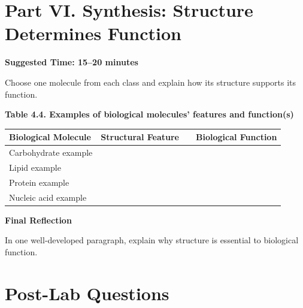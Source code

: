 \documentclass[
  letterpaper,
  DIV=11,
  numbers=noendperiod]{scrreprt}
\newcounter{none} %
\begin{document}
\section{\texorpdfstring{\textbf{Part VI. Synthesis: Structure
Determines
Function}}{Part VI. Synthesis: Structure Determines Function}}\label{part-vi.-synthesis-structure-determines-function}

\textbf{Suggested Time: 15--20 minutes}

Choose one molecule from each class and explain how its structure
supports its function.

\textbf{Table 4.4. Examples of biological molecules' features and
function(s)}

{\def\LTcaptype{none} %
\begin{longtable}[]{@{}
  >{\raggedright\arraybackslash}p{}
  >{\raggedright\arraybackslash}p{}
  >{\raggedright\arraybackslash}p{}
  >{\raggedright\arraybackslash}p{}@{}}
\toprule\noalign{}
\begin{minipage}[b]{\linewidth}\raggedright
\textbf{Biological Molecule}
\end{minipage} & \begin{minipage}[b]{\linewidth}\raggedright
\textbf{Structural Feature}
\end{minipage} & \begin{minipage}[b]{\linewidth}\raggedright
\end{minipage} & \begin{minipage}[b]{\linewidth}\raggedright
\textbf{Biological Function}
\end{minipage} \\
\midrule\noalign{}
\endhead
\bottomrule\noalign{}
\endlastfoot
Carbohydrate example & & & \\
Lipid example & & & \\
Protein example & & & \\
Nucleic acid example & & & \\
\end{longtable}
}

\textbf{\hfill\break
Final Reflection}

In one well-developed paragraph, explain why structure is essential to
biological function.

\section{\texorpdfstring{\textbf{Post-Lab
Questions}}{Post-Lab Questions}}\label{post-lab-questions}
\end{document}
